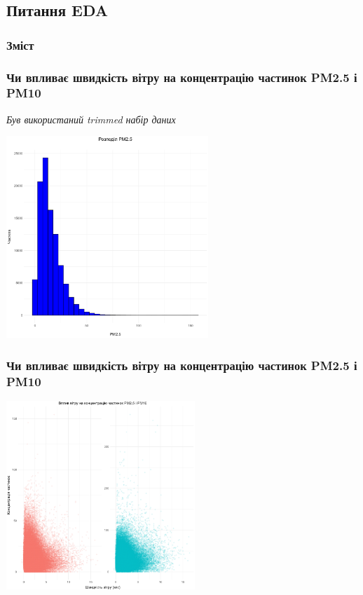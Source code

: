 \documentclass{beamer}
\begin{document}
\begin{frame}
  \section{Питання EDA}

  \frametitle{Зміст}
  \tableofcontents[currentsection]
\end{frame}


\begin{frame}
  \frametitle{Чи впливає швидкість вітру на концентрацію частинок PM2.5 і PM10}

  \quad \textit{Був використаний trimmed набір даних}

  \begin{center}
    \includegraphics[height=3in]{plots/question1/pm2_5_gist.png}
  \end{center}
\end{frame}

\begin{frame}
  \frametitle{Чи впливає швидкість вітру на концентрацію частинок PM2.5 і PM10}

  \begin{center}
    \includegraphics[height=2.8in]{plots/question1/wind_speed_vs_pm.png}
  \end{center}
\end{frame}
\end{document}
